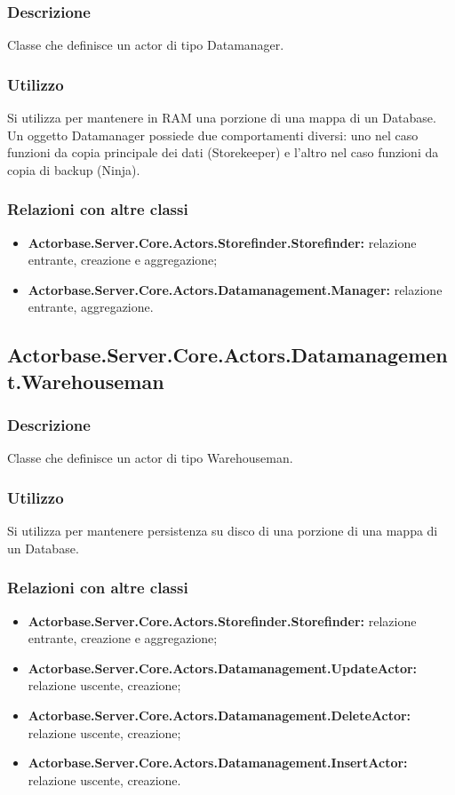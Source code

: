 \documentclass[a4paper]{article}
\begin{document}
			\subsubsection{Descrizione}
				Classe che definisce un actor di tipo Datamanager.
			\subsubsection{Utilizzo}
				Si utilizza per mantenere in RAM una porzione di una mappa di un Database. Un oggetto Datamanager possiede due comportamenti diversi: uno nel caso funzioni da copia principale dei dati (Storekeeper) e l'altro nel caso funzioni da copia di backup (Ninja).
			\subsubsection{Relazioni con altre classi}
				\begin{itemize}
				    \item \textbf{Actorbase.Server.Core.Actors.Storefinder.Storefinder:} relazione entrante, creazione e aggregazione;
				    \item \textbf{Actorbase.Server.Core.Actors.Datamanagement.Manager:} relazione entrante, aggregazione.
			    \end{itemize}
			
		\subsection{Actorbase.Server.Core.Actors.Datamanagement.Warehouseman}
			\subsubsection{Descrizione}
				Classe che definisce un actor di tipo Warehouseman.
			\subsubsection{Utilizzo}
				Si utilizza per mantenere persistenza su disco di una porzione di una mappa di un Database.
			\subsubsection{Relazioni con altre classi}
                \begin{itemize}
				    \item \textbf{Actorbase.Server.Core.Actors.Storefinder.Storefinder:} relazione entrante, creazione e aggregazione;
                    \item \textbf{Actorbase.Server.Core.Actors.Datamanagement.UpdateActor:} relazione uscente, creazione;
                    \item \textbf{Actorbase.Server.Core.Actors.Datamanagement.DeleteActor:} relazione uscente, creazione;
                    \item \textbf{Actorbase.Server.Core.Actors.Datamanagement.InsertActor:} relazione uscente, creazione.
                \end{itemize}
			
\end{document}
